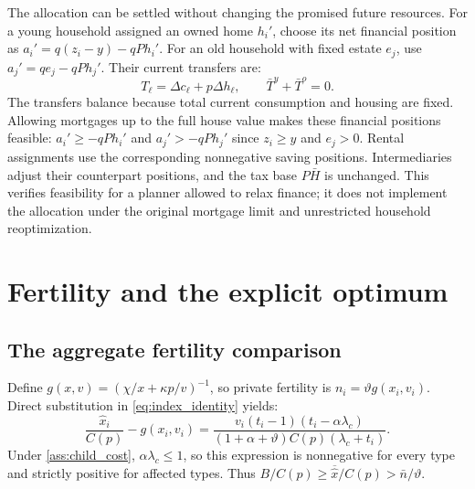 \documentclass[11pt]{article}
\newcommand{\avg}[1]{\overline{#1}}
\begin{document}
The allocation can be settled without changing the promised future resources.
For a young household assigned an owned home $h_i'$, choose its net financial
position as $a_i'=q(z_i-y)-qPh_i'$. For an old household with fixed estate
$e_j$, use $a_j'=qe_j-qPh_j'$. Their current transfers are:
\begin{equation}
T_\ell=\Delta c_\ell+p\Delta h_\ell,\qquad
\bar T^y+\bar T^o=0.
\end{equation}
The transfers balance because total current consumption and housing are fixed.
Allowing mortgages up to the full house value makes these financial positions
feasible: $a_i'\ge-qPh_i'$ and $a_j'>-qPh_j'$ since $z_i\ge y$ and
$e_j>0$. Rental assignments use the corresponding nonnegative saving
positions. Intermediaries adjust their counterpart positions, and the tax
base $P\bar H$ is unchanged. This verifies feasibility for a planner allowed
to relax finance; it does not implement the allocation under the original
mortgage limit and unrestricted household reoptimization.

\section{Fertility and the explicit optimum}\label{app:fertility}

\subsection{The aggregate fertility comparison}

Define $g(x,v)=(\chi/x+\kappa p/v)^{-1}$, so private fertility is
$n_i=\vartheta g(x_i,v_i)$. Direct substitution in
\eqref{eq:index_identity} yields:
\begin{equation}
\frac{\widehat x_i}{C(p)}-g(x_i,v_i)
 =\frac{v_i(t_i-1)(t_i-\alpha\lambda_c)}
 {(1+\alpha+\vartheta)C(p)(\lambda_c+t_i)}.
\label{eq:fertility_index}
\end{equation}
Under \eqref{ass:child_cost}, $\alpha\lambda_c\le1$, so this expression
is nonnegative for every type and strictly positive for affected types.
Thus $B/C(p)\ge\avg{\widehat x}/C(p)>\bar n/\vartheta$.
\end{document}
